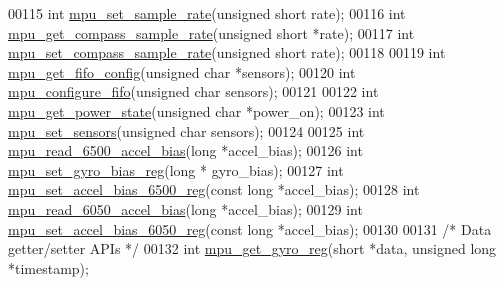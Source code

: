 \begin{DoxyCode}
00115 \textcolor{keywordtype}{int} \hyperlink{group___d_r_i_v_e_r_s_ga0144d666a67a82888b8580002afe8b55}{mpu\_set\_sample\_rate}(\textcolor{keywordtype}{unsigned} \textcolor{keywordtype}{short} rate);
00116 \textcolor{keywordtype}{int} \hyperlink{group___d_r_i_v_e_r_s_gab5a45cd7783f6937788c0decb0b18b16}{mpu\_get\_compass\_sample\_rate}(\textcolor{keywordtype}{unsigned} \textcolor{keywordtype}{short} *rate);
00117 \textcolor{keywordtype}{int} \hyperlink{group___d_r_i_v_e_r_s_ga78da3828de0ef9d080c4d03e7bc45e7b}{mpu\_set\_compass\_sample\_rate}(\textcolor{keywordtype}{unsigned} \textcolor{keywordtype}{short} rate);
00118 
00119 \textcolor{keywordtype}{int} \hyperlink{group___d_r_i_v_e_r_s_ga093f11eb10b2639a4b9fe344ea348c54}{mpu\_get\_fifo\_config}(\textcolor{keywordtype}{unsigned} \textcolor{keywordtype}{char} *sensors);
00120 \textcolor{keywordtype}{int} \hyperlink{group___d_r_i_v_e_r_s_gababbdda287e1f19323489f90a0889dd7}{mpu\_configure\_fifo}(\textcolor{keywordtype}{unsigned} \textcolor{keywordtype}{char} sensors);
00121 
00122 \textcolor{keywordtype}{int} \hyperlink{group___d_r_i_v_e_r_s_gaec8fa7a067988d174516bb735a4a0bc9}{mpu\_get\_power\_state}(\textcolor{keywordtype}{unsigned} \textcolor{keywordtype}{char} *power\_on);
00123 \textcolor{keywordtype}{int} \hyperlink{group___d_r_i_v_e_r_s_ga6e77e7cc1cf6be5e8fdf617c5b4586d1}{mpu\_set\_sensors}(\textcolor{keywordtype}{unsigned} \textcolor{keywordtype}{char} sensors);
00124 
00125 \textcolor{keywordtype}{int} \hyperlink{group___d_r_i_v_e_r_s_ga57bfbb356ce449135ce39659455041ae}{mpu\_read\_6500\_accel\_bias}(\textcolor{keywordtype}{long} *accel\_bias);
00126 \textcolor{keywordtype}{int} \hyperlink{group___d_r_i_v_e_r_s_ga01361a0f5c1f048cb0742bd3d0e4d3a5}{mpu\_set\_gyro\_bias\_reg}(\textcolor{keywordtype}{long} * gyro\_bias);
00127 \textcolor{keywordtype}{int} \hyperlink{group___d_r_i_v_e_r_s_gaa7265afee29b8307ff49a8b1ccd9238a}{mpu\_set\_accel\_bias\_6500\_reg}(\textcolor{keyword}{const} \textcolor{keywordtype}{long} *accel\_bias);
00128 \textcolor{keywordtype}{int} \hyperlink{group___d_r_i_v_e_r_s_gaed37421e1f140d10ee0eff0efeade27b}{mpu\_read\_6050\_accel\_bias}(\textcolor{keywordtype}{long} *accel\_bias);
00129 \textcolor{keywordtype}{int} \hyperlink{group___d_r_i_v_e_r_s_gae2eb5073dacc7455101bf6818e35c40a}{mpu\_set\_accel\_bias\_6050\_reg}(\textcolor{keyword}{const} \textcolor{keywordtype}{long} *accel\_bias);
00130 
00131 \textcolor{comment}{/* Data getter/setter APIs */}
00132 \textcolor{keywordtype}{int} \hyperlink{group___d_r_i_v_e_r_s_ga5555854590ad11495c0e30401294bae2}{mpu\_get\_gyro\_reg}(\textcolor{keywordtype}{short} *data, \textcolor{keywordtype}{unsigned} \textcolor{keywordtype}{long} *timestamp);

\end{DoxyCode}
